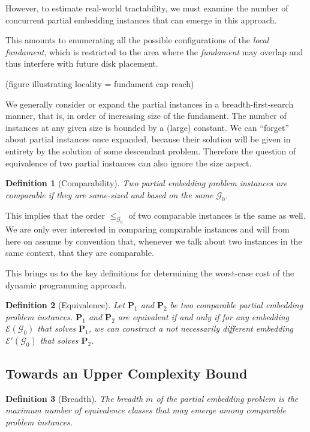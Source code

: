 \documentclass[draft,final]{vutinfth} %
\newtheorem{definition}{Definition}
\begin{document}
However, to estimate real-world tractability, we must examine the number of concurrent partial embedding instances that can emerge in this approach.

This amounts to enumerating all the possible configurations of the \emph{local fundament}, which is restricted to the area where the \emph{fundament} may overlap and thus interfere with future disk placement.

(figure illustrating locality = fundament cap reach)

We generally consider or expand the partial instances in a breadth-first-search manner, that is, in order of increasing size of the fundament. The number of instances at any given size is bounded by a (large) constant. We can ``forget'' about partial instances once expanded, because their solution will be given in entirety by the solution of some descendant problem. Therefore the question of equivalence of two partial instances can also ignore the size aspect.

\begin{definition}[Comparability]
Two partial embedding problem instances are \emph{comparable} if they are same-sized and based on the same $\mathcal G_0$.
\end{definition}

This implies that the order $\leq_{\mathcal G_0}$ of two comparable instances is the same as well.
We are only ever interested in comparing comparable instances and will from here on assume by convention that, whenever we talk about two instances in the same context, that they are comparable.

This brings us to the key definitions for determining the worst-case cost of the dynamic programming approach.

\begin{definition}[Equivalence]
Let $\mathbf P_1$ and $\mathbf P_2$ be two comparable partial embedding problem instances. $\mathbf P_1$ and $\mathbf P_2$ are \emph{equivalent} if and only if for any embedding $\mathcal E(\mathcal G_0)$ that solves $\mathbf P_1$, we can construct a not necessarily different embedding $\mathcal E'(\mathcal G_0)$ that solves $\mathbf P_2$.
\end{definition}

\subsection{Towards an Upper Complexity Bound}

\begin{definition}[Breadth]
The \emph{breadth} $\overline{m}$ of the partial embedding problem is the maximum number of equivalence classes that may emerge among comparable problem instances.
\end{definition}
\end{document}

